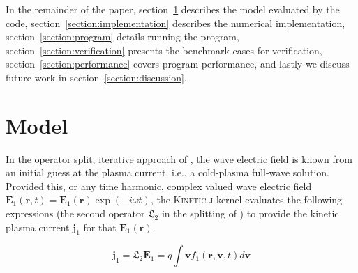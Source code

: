 \documentclass[final,5p,times,twocolumn]{elsarticle}
\renewcommand{\vec}[1]{\mathbf{#1}}
\newcommand{\kj}{\textsc{Kinetic-j}\xspace}
\newcommand{\jp}{\ensuremath{\vec{j}_{\mathrm{1}}}\xspace}
\begin{document}
In the remainder of the paper, section~\ref{section:model} describes the model evaluated by the code, section~\ref{section:implementation} describes the numerical implementation, section~\ref{section:program} details running the program, section~\ref{section:verification} presents the benchmark cases for verification, section~\ref{section:performance} covers program performance, and lastly we discuss future work in section~\ref{section:discussion}.
%
\section{Model}
\label{section:model}
%
In the operator split, iterative approach of \cite{green2014}, the wave electric field is known from an initial guess at the plasma current, i.e., a cold-plasma full-wave solution. Provided this, or any time harmonic, complex valued wave electric field $\vec{E}_{\mathrm{1}}\left(\vec{r},t\right)=\vec{E}_{\mathrm{1}}\left(\vec{r}\right)\exp{\left(-i\omega t\right)}$, the \kj kernel evaluates the following expressions (the second operator $\mathfrak{L}_{\mathrm{2}}$ in the splitting of \cite{green2014}) to provide the kinetic plasma current \jp for that $\vec{E}_{\mathrm{1}}\left(\vec{r}\right)$.

\begin{linenomath}
\begin{equation}
\jp=\mathfrak{L}_{\mathrm{2}}\vec{E}_{\mathrm{1}}=q\int \vec{v}f_{\mathrm{1}}\left(\vec{r},\vec{v},t\right)d\vec{v}
\label{eq:j1}
\end{equation}
\end{linenomath}
\end{document}
